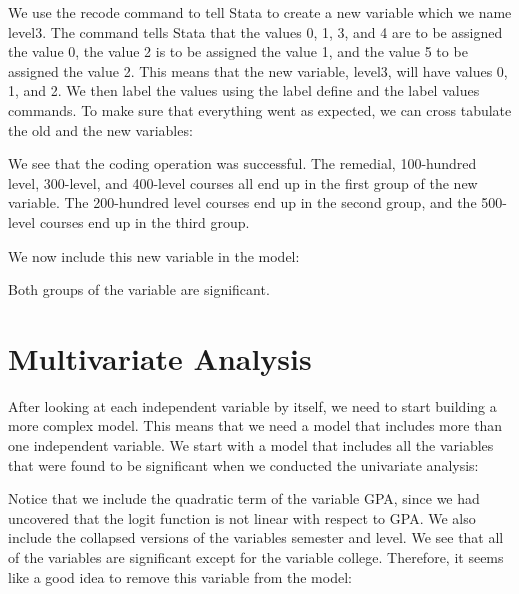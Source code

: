 \documentclass[a4paper,12pt,oneside]{book}
\begin{document}
\begin{stlog}\end{stlog}

We use the recode command to tell Stata to create a new variable which we name level3. The command tells Stata that the values 0, 1, 3, and 4 are to be assigned the value 0, the value 2 is to be assigned the value 1, 
and the value 5 to be assigned the value 2. This means that the new variable, level3, will have values 0, 1, and 2. We then label the values using the label define and the label values commands. To make sure that 
everything went as expected, we can cross tabulate the old and the new variables:

\begin{stlog}\end{stlog}

We see that the coding operation was successful. The remedial, 100-hundred level, 300-level, and 400-level courses all end up in the first group of the new variable. The 200-hundred level courses end up in the 
second group, and the 500-level courses end up in the third group.

We now include this new variable in the model:

\begin{stlog}\end{stlog}

Both groups of the variable are significant.
\section{Multivariate Analysis}
After looking at each independent variable by itself, we need to start building a more complex model. This means that we need a model that includes more than one independent variable. 
We start with a model that includes all the variables that were found to be significant when we conducted the univariate analysis:

\begin{stlog}\end{stlog}

Notice that we include the quadratic term of the variable GPA, since we had uncovered that the logit function is not linear with respect to GPA. We also include the collapsed versions of the 
variables semester and level. We see that all of the variables are significant except for the variable college. Therefore,  it seems like a good idea to remove this variable from the model:
\end{document}
